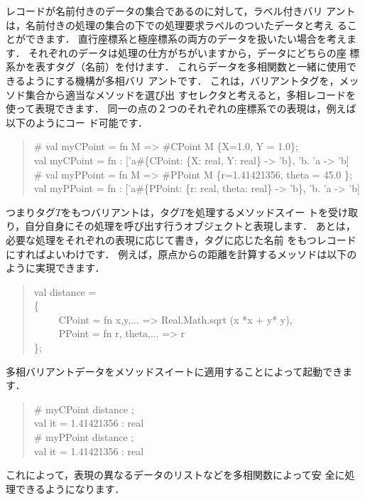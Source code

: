 \documentclass{jbook}
\newcommand{\myem}{\ \ \ \ \  }
\begin{document}
	レコードが名前付きのデータの集合であるのに対して，ラベル付きバリ
アントは，名前付きの処理の集合の下での処理要求ラベルのついたデータと考え
ることができます．
	直行座標系と極座標系の両方のデータを扱いたい場合を考えます．
	それぞれのデータは処理の仕方がちがいますから，データにどちらの座
標系かを表すタグ（名前）を付けます．
	これらデータを多相関数と一緒に使用できるようにする機構が多相バリ
アントです．
	これは，バリアントタグを，メッソド集合から適当なメソッドを選び出
すセレクタと考えると，多相レコードを使って表現できます．
	同一の点の２つのそれぞれの座標系での表現は，例えば以下のようにコー
ド可能です．		
\begin{tt}\begin{quote}
\# val myCPoint = fn M => \#CPoint M \{X=1.0, Y = 1.0\};\\
val myCPoint = fn : ['a\#\{CPoint: \{X: real, Y: real\} -> 'b\}, 'b. 'a -> 'b]\\
\# val myPPoint = fn M => \#PPoint M \{r=1.41421356, theta = 45.0 \};\\
val myPPoint = fn : ['a\#\{PPoint: \{r: real, theta: real\} -> 'b\}, 'b. 'a -> 'b]
\end{quote}\end{tt}
	つまりタグ$T$をもつバリアントは，タグ$T$を処理するメソッドスイー
トを受け取り，自分自身にその処理を呼び出す行うオブジェクトと表現します．
	あとは，必要な処理をそれぞれの表現に応じて書き，タグに応じた名前
をもつレコードにすればよいわけです．
	例えば，原点からの距離を計算するメッソドは以下のように実現できます．
\begin{tt}\begin{quote}
val distance = \\
\{\\
\myem CPoint = fn {x,y,...} => Real.Math.sqrt (x *x + y* y),\\
\myem PPoint = fn {r, theta,...} => r\\
\};
\end{quote}\end{tt}
	多相バリアントデータをメソッドスイートに適用することによって起動できます．
\begin{tt}\begin{quote}
\# myCPoint distance ;\\
val it = 1.41421356 : real\\
\# myPPoint distance ;\\
val it = 1.41421356 : real
\end{quote}\end{tt}
	これによって，表現の異なるデータのリストなどを多相関数によって安
全に処理できるようになります．
\end{document}
